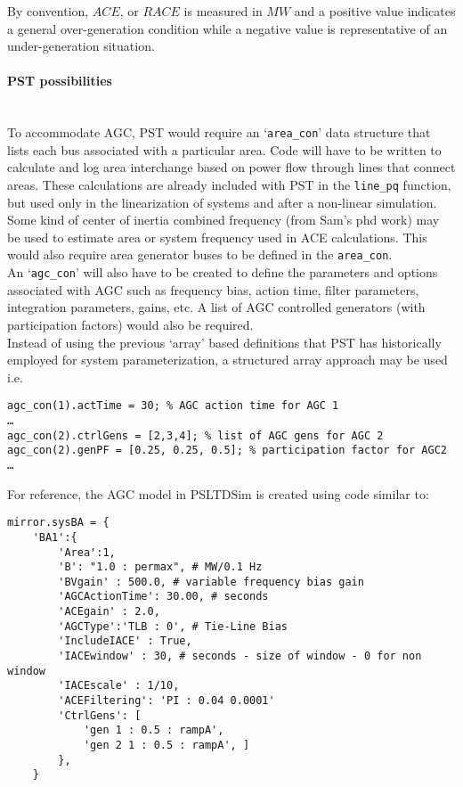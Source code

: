 \documentclass[12pt]{article}
\begin{document}
By convention, $ACE$, or $RACE$ is measured in $MW$ and a positive value indicates a general over-generation condition while a negative value is representative of an under-generation situation.

\pagebreak
\paragraph{PST possibilities} \ \\
To accommodate AGC, PST would require an ‘\verb|area_con|’ data structure that lists each bus associated with a particular area. 
Code will have to be written to calculate and log area interchange based on power flow through lines that connect areas. 
These calculations are already included with PST in the \verb|line_pq| function, but used only in the linearization of systems and after a non-linear simulation.\\

Some kind of center of inertia combined frequency (from Sam’s phd work) may be used to  estimate area or system frequency used in ACE calculations.
This would also require area generator buses to be defined in the \verb|area_con|.\\

An ‘\verb|agc_con|’ will also have to be created to define the parameters and options associated with AGC such as frequency bias, action time, filter parameters, integration parameters, gains, etc. 
A list of AGC controlled generators (with participation factors) would also be required. \\


Instead of using the previous ‘array’ based definitions that PST has historically employed for system parameterization, a structured array approach may be used i.e.

\begin{verbatim}
agc_con(1).actTime = 30; % AGC action time for AGC 1
…
agc_con(2).ctrlGens = [2,3,4]; % list of AGC gens for AGC 2
agc_con(2).genPF = [0.25, 0.25, 0.5]; % participation factor for AGC2
…
\end{verbatim}
For reference, the AGC model in PSLTDSim is created using code similar to:


\begin{verbatim}
mirror.sysBA = {
    'BA1':{
        'Area':1,
        'B': "1.0 : permax", # MW/0.1 Hz
        'BVgain' : 500.0, # variable frequency bias gain
        'AGCActionTime': 30.00, # seconds 
        'ACEgain' : 2.0,
        'AGCType':'TLB : 0', # Tie-Line Bias 
        'IncludeIACE' : True,
        'IACEwindow' : 30, # seconds - size of window - 0 for non window
        'IACEscale' : 1/10,
        'ACEFiltering': 'PI : 0.04 0.0001'
        'CtrlGens': [
            'gen 1 : 0.5 : rampA',
            'gen 2 1 : 0.5 : rampA', ]
        },
    }
        \end{verbatim}     
        
\end{document}
